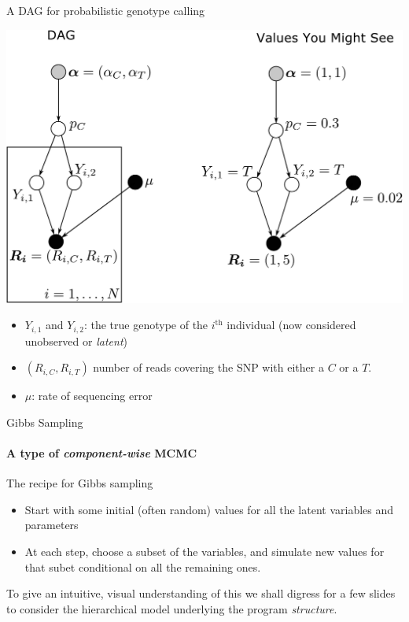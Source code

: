 \documentclass[letter,graphicx]{beamer}
\newcommand{\thh}{^\mathrm{th}}
\begin{document}
\begin{frame}{A DAG for probabilistic genotype calling}

\begin{center}
\includegraphics[width=.65\textwidth]{../diagrams/slide_genos-and-reads-dag-crop.pdf}
\end{center}
\begin{itemize}
\item $Y_{i,1}$ and $Y_{i,2}$: the true genotype of the $i\thh$ individual (now considered unobserved or {\em latent})
\item $(R_{i,C}, R_{i,T})$ number of reads covering the SNP with either a $C$ or a $T$.
\item $\mu$: rate of sequencing error
\end{itemize}
\end{frame}








\begin{frame}{Gibbs Sampling}
\framesubtitle{A type of {\em component-wise} MCMC}
The recipe for Gibbs sampling
\begin{itemize}
\item Start with some initial (often random) values for all the latent variables and parameters
\item At each step, choose a subset of the variables, and simulate new values for that subet
conditional on all the remaining ones.
\end{itemize}
To give an intuitive, visual understanding of this we shall digress for a few slides to
consider the hierarchical model underlying the program {\em structure}.
\end{frame}
\end{document}
